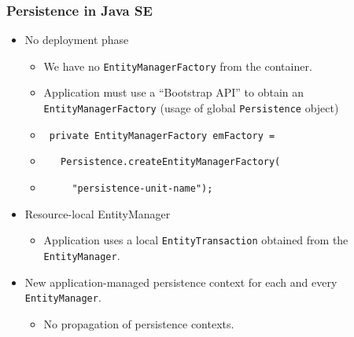 \documentclass[10pt,xcolor=pdflatex]{beamer}
\begin{document}
\begin{frame}[fragile]\frametitle{Persistence in Java SE}
	\begin{itemize}
		\item No deployment phase
          \begin{itemize}
            \item We have no \texttt{EntityManagerFactory} from the container.
        	\item Application must use a ``Bootstrap API'' to obtain an \texttt{EntityManagerFactory} (usage of global \texttt{Persistence} object)
            \item[] \verb+ private EntityManagerFactory emFactory = +
            \item[] \verb+   Persistence.createEntityManagerFactory(+
            \item[] \verb+     "persistence-unit-name");+
          \end{itemize}
        \bigskip
		\item Resource-local EntityManager
          \begin{itemize}
        	\item Application uses a local \texttt{EntityTransaction} obtained from the \texttt{EntityManager}.
          \end{itemize}
        \bigskip
		\item New application-managed persistence context for each and every \texttt{EntityManager}.
          \begin{itemize}
        	\item No propagation of persistence contexts.
          \end{itemize}
	\end{itemize}
\end{frame}
\end{document}

